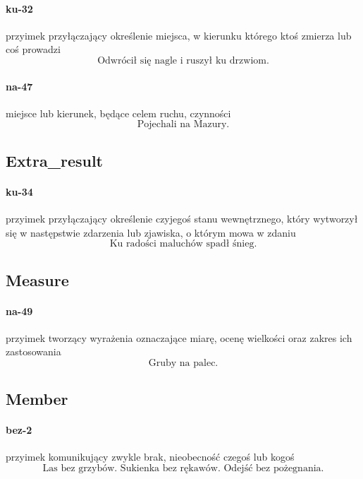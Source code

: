 \documentclass[a4paper, 12pt]{article}
\theoremstyle{remark}
\begin{document}
\paragraph{ku-32} \label{prep-32}	przyimek przyłączający określenie miejsca, w kierunku którego ktoś zmierza lub coś prowadzi
\begin{equation}
\text{Odwrócił się nagle i ruszył ku drzwiom.}
\end{equation}
\paragraph{na-47} \label{prep-47}	miejsce lub kierunek, będące celem ruchu, czynności
\begin{equation}
\text{Pojechali na Mazury.}
\end{equation}

\subsection{Extra\_result} %
\label{sub:manner}
\paragraph{ku-34} \label{prep-34}	przyimek przyłączający określenie czyjegoś stanu wewnętrznego, który wytworzył się w następstwie zdarzenia lub zjawiska, o którym mowa w zdaniu
\begin{equation}
\text{Ku radości maluchów spadł śnieg.}
\end{equation}

\subsection{Measure} %
\label{sub:measure}
\paragraph{na-49} \label{prep-49}	przyimek tworzący wyrażenia oznaczające miarę, ocenę wielkości oraz zakres ich zastosowania
\begin{equation}
\text{Gruby na palec.}
\end{equation}

\subsection{Member} %
\label{sub:member}
\paragraph{bez-2} \label{prep-2}	przyimek komunikujący zwykle brak, nieobecność czegoś lub kogoś
\begin{equation}
\text{Las bez grzybów. Sukienka bez rękawów. Odejść bez pożegnania.}
\end{equation}
\end{document}
